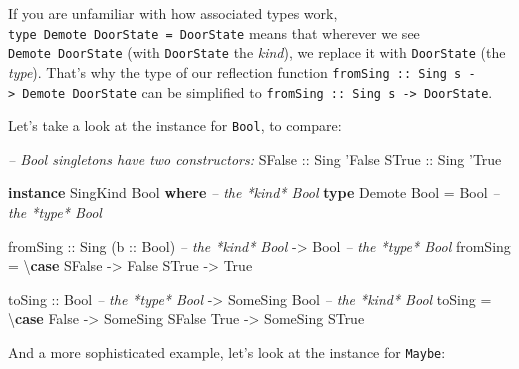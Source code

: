 \documentclass[]{article}
\newenvironment{Shaded}{}{}
\newcommand{\CommentTok}[1]{\textcolor[rgb]{0.38,0.63,0.69}{\textit{#1}}}
\newcommand{\DataTypeTok}[1]{\textcolor[rgb]{0.56,0.13,0.00}{#1}}
\newcommand{\FunctionTok}[1]{\textcolor[rgb]{0.02,0.16,0.49}{#1}}
\newcommand{\KeywordTok}[1]{\textcolor[rgb]{0.00,0.44,0.13}{\textbf{#1}}}
\newcommand{\NormalTok}[1]{#1}
\newcommand{\OtherTok}[1]{\textcolor[rgb]{0.00,0.44,0.13}{#1}}
\begin{document}
If you are unfamiliar with how associated types work,
\texttt{type\ Demote\ DoorState\ =\ DoorState} means that wherever we see
\texttt{Demote\ DoorState} (with \texttt{DoorState} the \emph{kind}), we replace
it with \texttt{DoorState} (the \emph{type}). That's why the type of our
reflection function
\texttt{fromSing\ ::\ Sing\ s\ -\textgreater{}\ Demote\ DoorState} can be
simplified to \texttt{fromSing\ ::\ Sing\ s\ -\textgreater{}\ DoorState}.

Let's take a look at the instance for \texttt{Bool}, to compare:

\begin{Shaded}
\begin{Highlighting}[]
\CommentTok{-- Bool singletons have two constructors:}
\DataTypeTok{SFalse}\OtherTok{ ::} \DataTypeTok{Sing}\NormalTok{ '}\DataTypeTok{False}
\DataTypeTok{STrue}\OtherTok{  ::} \DataTypeTok{Sing}\NormalTok{ '}\DataTypeTok{True}

\KeywordTok{instance} \DataTypeTok{SingKind} \DataTypeTok{Bool} \KeywordTok{where}    \CommentTok{-- the *kind* Bool}
    \KeywordTok{type} \DataTypeTok{Demote} \DataTypeTok{Bool} \FunctionTok{=} \DataTypeTok{Bool}     \CommentTok{-- the *type* Bool}

\NormalTok{    fromSing}
\OtherTok{        ::} \DataTypeTok{Sing}\NormalTok{ (}\OtherTok{b ::} \DataTypeTok{Bool}\NormalTok{)        }\CommentTok{-- the *kind* Bool}
        \OtherTok{->} \DataTypeTok{Bool}                    \CommentTok{-- the *type* Bool}
\NormalTok{    fromSing }\FunctionTok{=}\NormalTok{ \textbackslash{}}\KeywordTok{case}
        \DataTypeTok{SFalse} \OtherTok{->} \DataTypeTok{False}
        \DataTypeTok{STrue}  \OtherTok{->} \DataTypeTok{True}

\NormalTok{    toSing}
\OtherTok{        ::} \DataTypeTok{Bool}                    \CommentTok{-- the *type* Bool}
        \OtherTok{->} \DataTypeTok{SomeSing} \DataTypeTok{Bool}           \CommentTok{-- the *kind* Bool}
\NormalTok{    toSing }\FunctionTok{=}\NormalTok{ \textbackslash{}}\KeywordTok{case}
        \DataTypeTok{False} \OtherTok{->} \DataTypeTok{SomeSing} \DataTypeTok{SFalse}
        \DataTypeTok{True}  \OtherTok{->} \DataTypeTok{SomeSing} \DataTypeTok{STrue}
\end{Highlighting}
\end{Shaded}

And a more sophisticated example, let's look at the instance for \texttt{Maybe}:
\end{document}
